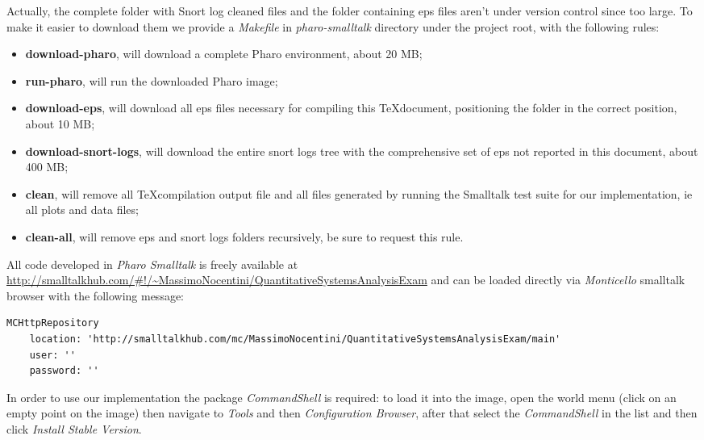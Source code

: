 \documentclass[10pt,a4paper]{article}
\begin{document}
    Actually, the complete folder with Snort log cleaned files and the
    folder containing eps files aren't under version control since too
    large. To make it easier to download them we provide a
    \emph{Makefile} in \emph{pharo-smalltalk} directory under the
    project root, with the following rules:
    \begin{itemize}
    \item \textbf{download-pharo}, will download a complete Pharo environment, about 20 MB;
    \item \textbf{run-pharo}, will run the downloaded Pharo image;
    \item \textbf{download-eps}, will download all eps files necessary
      for compiling this \TeX document, positioning the folder in the
      correct position, about 10 MB;
    \item \textbf{download-snort-logs}, will download the entire snort
      logs tree with the comprehensive set of eps not reported in this
      document, about 400 MB;
    \item \textbf{clean}, will remove all \TeX compilation output file
      and all files generated by running the Smalltalk test suite for
      our implementation, ie all plots and data files;
    \item \textbf{clean-all}, will remove eps and snort logs folders
      recursively, be sure to request this rule.
    \end{itemize}

    \newpage

    All code developed in \emph{Pharo Smalltalk} is freely available
    at
    \url{http://smalltalkhub.com/#!/~MassimoNocentini/QuantitativeSystemsAnalysisExam}
    and can be loaded directly via \emph{Monticello} smalltalk browser
    with the following message:
    \begin{adjustwidth}{-2cm}{}
\begin{verbatim}
MCHttpRepository
	location: 'http://smalltalkhub.com/mc/MassimoNocentini/QuantitativeSystemsAnalysisExam/main'
	user: ''
	password: ''
\end{verbatim}
    \end{adjustwidth}    
    In order to use our implementation the package \emph{CommandShell}
    is required: to load it into the image, open the world menu (click
    on an empty point on the image) then navigate to \emph{Tools} and
    then \emph{Configuration Browser}, after that select the
    \emph{CommandShell} in the list and then click \emph{Install
      Stable Version}.
      
\end{document}
